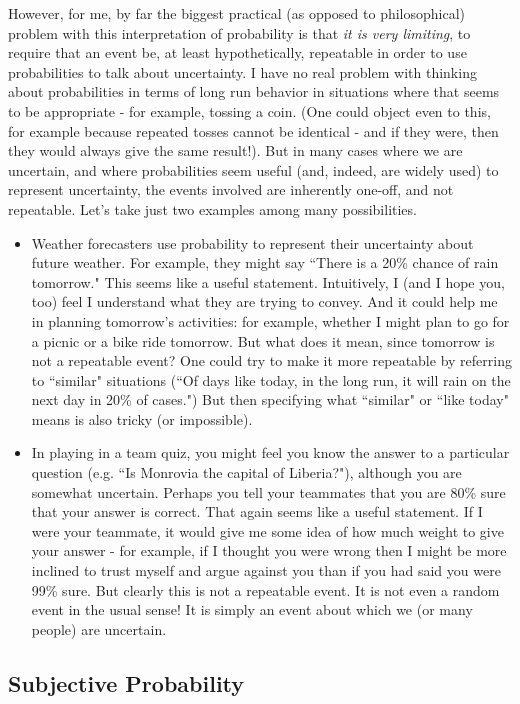 \documentclass{article}[11pt]
\begin{document}
However, for me, by far the biggest practical (as opposed to philosophical) problem with
this interpretation of probability is that {\it it is very limiting}, to require that an event be, at least  hypothetically, repeatable in order to use probabilities to talk about uncertainty. I have no
real problem with thinking about probabilities
in terms of long run behavior in situations where that seems to be appropriate - for example, tossing a coin. (One could object even to this, for example because repeated tosses cannot be identical - and if they were, then they would always give the same result!). But in many cases where we are uncertain, and where probabilities seem useful (and, indeed, are widely used) to represent uncertainty, the events involved are inherently one-off, and not repeatable.
Let's take just two examples among many possibilities.
\begin{itemize}
\item Weather forecasters use probability to represent their uncertainty about future weather. For example, they might say ``There is a 20\% chance of rain tomorrow." This seems like a useful statement. Intuitively, I (and I hope you, too) feel I understand what they are trying to convey.  And it could help me in planning
tomorrow's activities:  for example, whether
I might plan to go for a picnic or a bike ride tomorrow. But what does it mean, since tomorrow
is not a repeatable event? One could try to 
make it more repeatable by referring to  ``similar" situations (``Of days like today, in the long run, it will rain on the next day in 20\% of cases.") But then specifying what ``similar" or ``like today" means is also tricky (or impossible).
\item In playing in a team quiz, you might feel you know the answer to a particular question (e.g. ``Is Monrovia the capital of Liberia?"), although you
are somewhat uncertain. Perhaps you tell your teammates that you are 80\% sure that your answer is correct. That again seems like a useful statement. If I were your teammate, it would give me some idea of how much weight to give your
answer - for example, if I thought you were wrong then I might be more inclined to trust myself and argue against you than if you had said you were 99\% sure. But clearly this is not a repeatable event. It is not even a random event in the usual sense! It is simply an event about which we (or many people) are uncertain.
\end{itemize}



\subsection{Subjective Probability}
\end{document}
